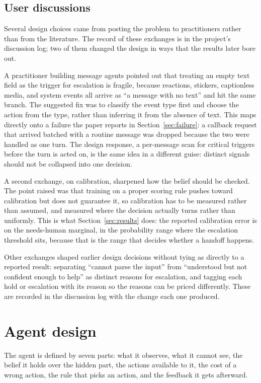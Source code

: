 \documentclass{article}
\begin{document}
\subsection{User discussions}
Several design choices came from posting the problem to practitioners rather than
from the literature. The record of these exchanges is in the project's
discussion log; two of them changed the design in ways that the results later
bore out.

A practitioner building message agents pointed out that treating an empty text
field as the trigger for escalation is fragile, because reactions, stickers,
captionless media, and system events all arrive as ``a message with no text'' and
hit the same branch. The suggested fix was to classify the event type first and
choose the action from the type, rather than inferring it from the absence of
text. This maps directly onto a failure the paper reports in
Section~\ref{sec:failure}: a callback request that arrived batched with a routine
message was dropped because the two were handled as one turn. The design response,
a per-message scan for critical triggers before the turn is acted on, is the same
idea in a different guise: distinct signals should not be collapsed into one
decision.

A second exchange, on calibration, sharpened how the belief should be checked. The
point raised was that training on a proper scoring rule pushes toward calibration
but does not guarantee it, so calibration has to be measured rather than assumed,
and measured where the decision actually turns rather than uniformly. This is
what Section~\ref{sec:results} does: the reported calibration error is on the
needs-human marginal, in the probability range where the escalation threshold
sits, because that is the range that decides whether a handoff happens.

Other exchanges shaped earlier design decisions without tying as directly to a
reported result: separating ``cannot parse the input'' from ``understood but not
confident enough to help'' as distinct reasons for escalation, and tagging each
hold or escalation with its reason so the reasons can be priced differently.
These are recorded in the discussion log with the change each one produced.

\section{Agent design}
\label{sec:design}

The agent is defined by seven parts: what it observes, what it cannot see, the
belief it holds over the hidden part, the actions available to it, the cost of a
wrong action, the rule that picks an action, and the feedback it gets afterward.
\end{document}

